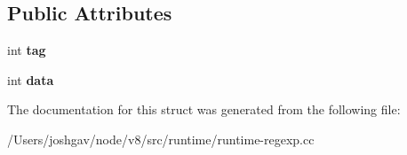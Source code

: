 \subsection*{Public Attributes}
\begin{DoxyCompactItemize}
\item 
int {\bfseries tag}\hypertarget{structv8_1_1internal_1_1_compiled_replacement_1_1_replacement_part_a53b37d9855bbe2a7ca1a950165739e6d}{}\label{structv8_1_1internal_1_1_compiled_replacement_1_1_replacement_part_a53b37d9855bbe2a7ca1a950165739e6d}

\item 
int {\bfseries data}\hypertarget{structv8_1_1internal_1_1_compiled_replacement_1_1_replacement_part_a94ef6db4eb2e0c30d12b4d71ec2458d6}{}\label{structv8_1_1internal_1_1_compiled_replacement_1_1_replacement_part_a94ef6db4eb2e0c30d12b4d71ec2458d6}

\end{DoxyCompactItemize}


The documentation for this struct was generated from the following file\+:\begin{DoxyCompactItemize}
\item 
/\+Users/joshgav/node/v8/src/runtime/runtime-\/regexp.\+cc\end{DoxyCompactItemize}
